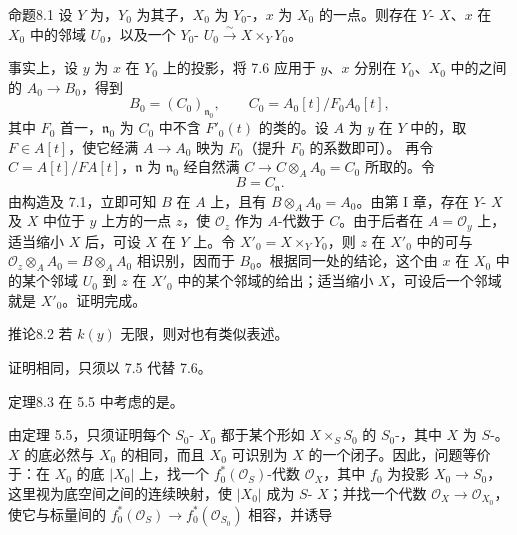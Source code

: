 \begin{SGAresult}{命题}{8.1}
设 $Y$ 为，$Y_0$ 为其子，$X_0$ 为 $Y_0$-，$x$ 为 $X_0$ 的一点。则存在 $Y$- $X$、$x$ 在 $X_0$ 中的邻域 $U_0$，以及一个 $Y_0$- $U_0\xrightarrow{\sim}X\times_Y Y_0$。
\end{SGAresult}
事实上，设 $y$ 为 $x$ 在 $Y_0$ 上的投影，将 7.6 应用于 $y$、$x$ 分别在 $Y_0$、$X_0$ 中的之间的 $A_0\to B_0$，得到
\[
 B_0=(C_0)_{\mathfrak n_0},\qquad C_0=A_0[t]/F_0A_0[t],
\]
其中 $F_0$ 首一，$\mathfrak n_0$ 为 $C_0$ 中不含 $F'_0(t)$ 的类的。设 $A$ 为 $y$ 在 $Y$ 中的，取 $F\in A[t]$，使它经满 $A\to A_0$ 映为 $F_0$（提升 $F_0$ 的系数即可）。
再令 $C=A[t]/FA[t]$，$\mathfrak n$ 为 $\mathfrak n_0$ 经自然满 $C\to C\otimes_A A_0=C_0$ 所取的。令
\[
 B=C_{\mathfrak n}.
\]
由构造及 7.1，立即可知 $B$ 在 $A$ 上，且有 $B\otimes_A A_0=A_0$。由第 I 章，存在 $Y$- $X$ 及 $X$ 中位于 $y$ 上方的一点 $z$，使 $\mathcal O_z$ 作为 $A$-代数于 $C$。由于后者在 $A=\mathcal O_y$ 上，适当缩小 $X$ 后，可设 $X$ 在 $Y$ 上。令 $X'_0=X\times_Y Y_0$，则 $z$ 在 $X'_0$ 中的可与 $\mathcal O_z\otimes_A A_0=B\otimes_A A_0$ 相识别，因而于 $B_0$。根据同一处的结论，这个由 $x$ 在 $X_0$ 中的某个邻域 $U_0$ 到 $z$ 在 $X'_0$ 中的某个邻域的给出；适当缩小 $X$，可设后一个邻域就是 $X'_0$。证明完成。
\begin{SGAresult}{推论}{8.2}
若 $k(y)$ 无限，则对也有类似表述。
\end{SGAresult}
证明相同，只须以 7.5 代替 7.6。
\begin{SGAresult}{定理}{8.3}
在 5.5 中考虑的是。
\end{SGAresult}
由定理 5.5，只须证明每个 $S_0$- $X_0$ 都于某个形如 $X\times_S S_0$ 的 $S_0$-，其中 $X$ 为 $S$-。$X$ 的底必然与 $X_0$ 的相同，而且 $X_0$ 可识别为 $X$ 的一个闭子。因此，问题等价于：在 $X_0$ 的底 $|X_0|$ 上，找一个 $f_0^*(\mathcal O_S)$-代数 $\mathcal O_X$，其中 $f_0$ 为投影 $X_0\to S_0$，这里视为底空间之间的连续映射，使 $|X_0|$ 成为 $S$- $X$；并找一个代数 $\mathcal O_X\to\mathcal O_{X_0}$，使它与标量间的 $f_0^*(\mathcal O_S)\to f_0^*(\mathcal O_{S_0})$ 相容，并诱导
